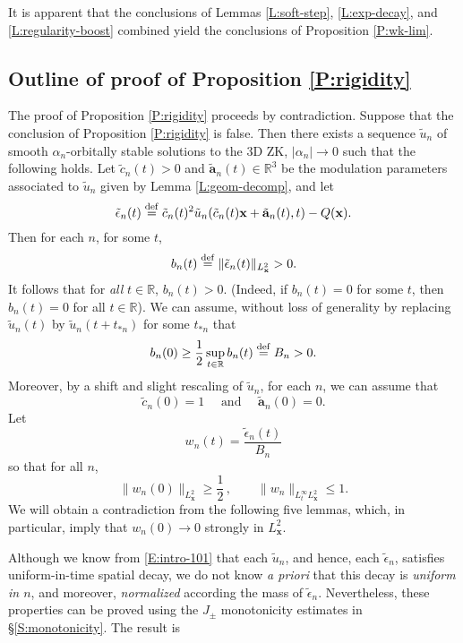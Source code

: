 \documentclass[12pt,letterpaper]{amsart}
\newcommand{\defeq}{\stackrel{\rm{def}}{=}}
\theoremstyle{remark}
\numberwithin{equation}{section}
\numberwithin{theorem}{section}
\numberwithin{table}{section}
\begin{document}
It is apparent that the conclusions of Lemmas \ref{L:soft-step},  \ref{L:exp-decay}, and \ref{L:regularity-boost} combined yield the conclusions of Proposition \ref{P:wk-lim}.

\subsection{Outline of proof of Proposition \ref{P:rigidity}}

The proof of Proposition \ref{P:rigidity} proceeds by contradiction.  Suppose that the conclusion of Proposition \ref{P:rigidity} is false.  Then there exists a sequence $\tilde u_n$ of smooth $\alpha_n$-orbitally stable solutions to the 3D ZK, $|\alpha_n| \to 0$ such that the following holds.  Let $\tilde c_n(t)>0$ and $\tilde{\mathbf{a}}_n(t) \in \mathbb{R}^3$ be the modulation parameters associated to $\tilde u_n$ given by Lemma \ref{L:geom-decomp}, and let
\begin{equation}
\label{E:intro-100}
\tilde \epsilon_n(t) \defeq \tilde c_n(t)^2 \tilde u_n (\tilde c_n(t)\mathbf{x} + \tilde{\mathbf{a}}_n(t), t) - Q(\mathbf{x}).
\end{equation}
Then for each $n$, for some $t$, 
$$
b_n(t) \defeq \| \tilde \epsilon_n(t) \|_{L_{\mathbf{x}}^2}>0.
$$
It follows that for \emph{all} $t\in \mathbb{R}$, $b_n(t)>0$.  (Indeed, if $b_n(t)=0$ for some $t$, then $b_n(t)=0$ for all $t\in \mathbb{R}$).  We can assume, without loss of generality by replacing $\tilde u_n(t)$ by $\tilde u_n(t+t_{*n})$ for some $t_{*n}$ that
$$ 
b_n(0) \geq \frac12 \sup_{t\in \mathbb{R}} b_n(t) \defeq B_n>0.
$$
Moreover, by a shift and slight rescaling of $\tilde u_n$, for each $n$, we can assume that
$$
\tilde c_n(0) =1 \quad \text{ and } \quad \tilde{\mathbf{a}}_n(0)=0.
$$
Let
\begin{equation}
\label{E:intro-102}
w_n(t) = \frac{\tilde \epsilon_n(t)}{B_n}
\end{equation}
so that for all $n$, 
$$
\|w_n(0) \|_{L_{\mathbf{x}}^2} \geq \frac12 \,, \qquad \|w_n \|_{L_t^\infty L_{\mathbf{x}}^2} \leq 1.
$$
We will obtain a contradiction from the following five lemmas, which, in particular, imply that $w_n(0) \to 0$ strongly in $L_{\mathbf{x}}^2$.

Although we know from \eqref{E:intro-101} that each $\tilde u_n$, and hence, each $\tilde \epsilon_n$, satisfies uniform-in-time spatial decay, we do not know \emph{a priori} that this decay is \emph{uniform in $n$}, and moreover, \emph{normalized} according the mass of $\tilde \epsilon_n$.   Nevertheless, these properties can be proved using the $J_\pm$ monotonicity estimates in \S\ref{S:monotonicity}. The result is
\end{document}
